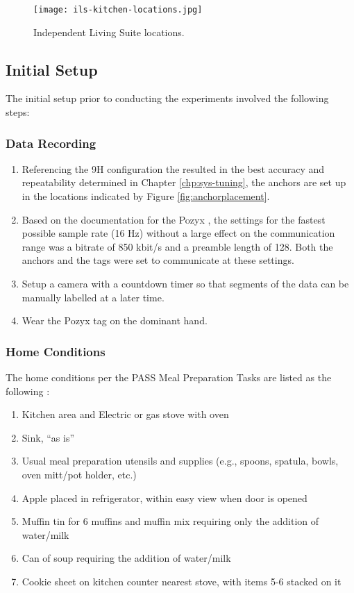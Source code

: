 \begin{figure}[ht]
    \centering
    \texttt{[image: ils-kitchen-locations.jpg]}
    \caption{Independent Living Suite locations.}
    \label{fig:ils-item-locs}
\end{figure}


\subsection{Initial Setup}
The initial setup prior to conducting the experiments involved the following steps:

\subsubsection{Data Recording}
\begin{enumerate}
    \item Referencing the 9H configuration the resulted in the best accuracy and repeatability determined in Chapter \ref{chp:sys-tuning}, the anchors are set up in the locations indicated by Figure \ref{fig:anchorplacement}.
    \item Based on the documentation for the Pozyx \cite{pozyx_configuration_nodate}, the settings for the fastest possible sample rate (16 Hz) without a large effect on the communication range was a bitrate of 850 kbit/s and a preamble length of 128. Both the anchors and the tags were set to communicate at these settings.
    \item Setup a camera with a countdown timer so that segments of the data can be manually labelled at a later time.
    \item Wear the Pozyx tag on the dominant hand.
\end{enumerate}

\subsubsection{Home Conditions}
The home conditions per the PASS Meal Preparation Tasks are listed as the following \cite{rogers_performance_2014}:
\begin{enumerate}
    \item Kitchen area and Electric or gas stove with oven
    \item Sink, “as is”
    \item Usual meal preparation utensils and supplies (e.g., spoons, spatula, bowls, oven mitt/pot holder, etc.)
    \item Apple placed in refrigerator, within easy view when door is opened
    \item Muffin tin for 6 muffins and muffin mix requiring only the addition of water/milk
    \item Can of soup requiring the addition of water/milk
    \item Cookie sheet on kitchen counter nearest stove, with items 5-6 stacked on it
\end{enumerate}


